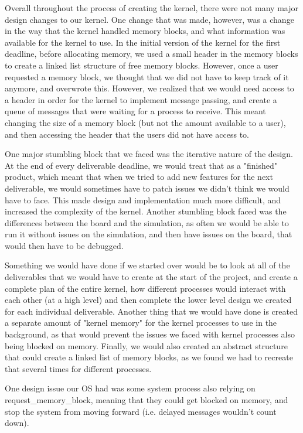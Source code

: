 \documentclass[12pt]{article}
\begin{document}
\quad Overall throughout the process of creating the kernel, there were not many major design changes to our kernel. One change that was made, however, was a change in the way that the kernel handled memory blocks, and what information was available for the kernel to use. In the initial version of the kernel for the first deadline, before allocating memory, we used a small header in the memory blocks to create a linked list structure of free memory blocks. However, once a user requested a memory block, we thought that we did not have to keep track of it anymore, and overwrote this. However, we realized that we would need access to a header in order for the kernel to implement message passing, and create a queue of messages that were waiting for a process to receive. This meant changing the size of a memory block (but not the amount available to a user), and then accessing the header that the users did not have access to.

\quad One major stumbling block that we faced was the iterative nature of the design. At the end of every deliverable deadline, we would treat that as a "finished" product, which meant that when we tried to add new features for the next deliverable, we would sometimes have to patch issues we didn't think we would have to face. This made design and implementation much more difficult, and increased the complexity of the kernel. Another stumbling block faced was the differences between the board and the simulation, as often we would be able to run it without issues on the simulation, and then have issues on the board, that would then have to be debugged.

\quad Something we would have done if we started over would be to look at all of the deliverables that we would have to create at the start of the project, and create a complete plan of the entire kernel, how different processes would interact with each other (at a high level) and then complete the lower level design we created for each individual deliverable. Another thing that we would have done is created a separate amount of "kernel memory" for the kernel processes to use in the background, as that would prevent the issues we faced with kernel processes also being blocked on memory. Finally, we would also created an abstract structure that could create a linked list of memory blocks, as we found we had to recreate that several times for different processes.

\quad One design issue our OS had was some system process also relying on request\_memory\_block, meaning that they could get blocked on memory, and stop the system from moving forward (i.e. delayed messages wouldn't count down).
\end{document}
